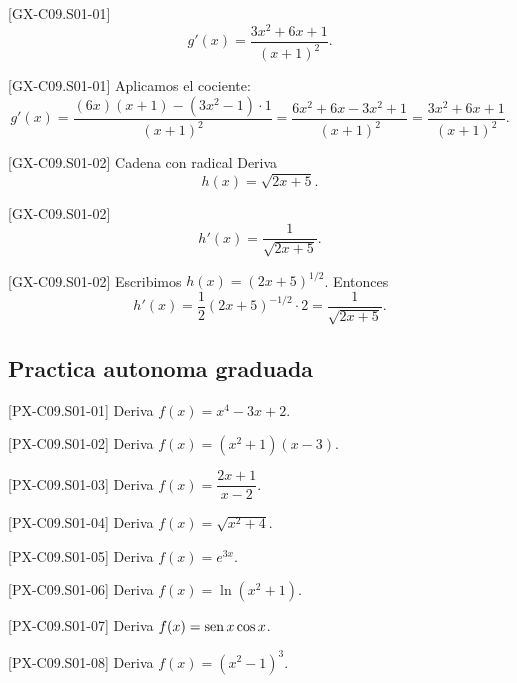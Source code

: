 \begin{shortanswer}{[GX-C09.S01-01]}
\[
g'(x)=\frac{3x^2+6x+1}{(x+1)^2}.
\]
\end{shortanswer}

\begin{fullsolution}{[GX-C09.S01-01]}
Aplicamos el cociente:
\[
g'(x)=\frac{(6x)(x+1)-(3x^2-1)\cdot 1}{(x+1)^2}
=\frac{6x^2+6x-3x^2+1}{(x+1)^2}
=\frac{3x^2+6x+1}{(x+1)^2}.
\]
\end{fullsolution}

\begin{guidedexercise}{[GX-C09.S01-02] Cadena con radical}
Deriva
\[
h(x)=\sqrt{2x+5}.
\]
\end{guidedexercise}

\begin{shortanswer}{[GX-C09.S01-02]}
\[
h'(x)=\frac{1}{\sqrt{2x+5}}.
\]
\end{shortanswer}

\begin{fullsolution}{[GX-C09.S01-02]}
Escribimos \(h(x)=(2x+5)^{1/2}\). Entonces
\[
h'(x)=\frac{1}{2}(2x+5)^{-1/2}\cdot 2=\frac{1}{\sqrt{2x+5}}.
\]
\end{fullsolution}

\subsection*{Practica autonoma graduada}
\begin{exercise}{[PX-C09.S01-01] Deriva \(f(x)=x^4-3x+2\).}
\end{exercise}
\begin{exercise}{[PX-C09.S01-02] Deriva \(f(x)=(x^2+1)(x-3)\).}
\end{exercise}
\begin{exercise}{[PX-C09.S01-03] Deriva \(f(x)=\dfrac{2x+1}{x-2}\).}
\end{exercise}
\begin{exercise}{[PX-C09.S01-04] Deriva \(f(x)=\sqrt{x^2+4}\).}
\end{exercise}
\begin{exercise}{[PX-C09.S01-05] Deriva \(f(x)=e^{3x}\).}
\end{exercise}
\begin{exercise}{[PX-C09.S01-06] Deriva \(f(x)=\ln(x^2+1)\).}
\end{exercise}
\begin{exercise}{[PX-C09.S01-07] Deriva \(f(x)=\operatorname{sen} x\cos x\).}
\end{exercise}
\begin{exercise}{[PX-C09.S01-08] Deriva \(f(x)=(x^2-1)^3\).}
\end{exercise}

